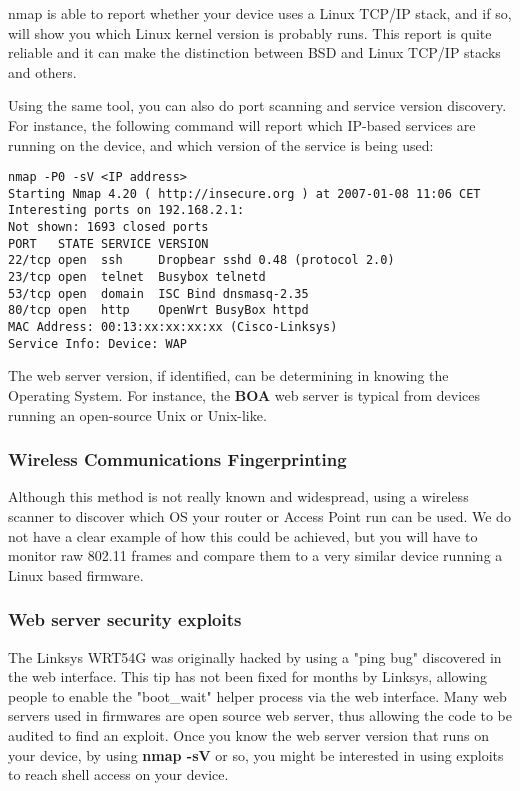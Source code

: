 nmap is able to report whether your device uses a Linux TCP/IP stack, and if so,
will show you which Linux kernel version is probably runs. This report is quite 
reliable and it can make the distinction between BSD and Linux TCP/IP stacks and others.

Using the same tool, you can also do port scanning and service version discovery.
For instance, the following command will report which IP-based services are running
on the device, and which version of the service is being used:

\begin{verbatim}
nmap -P0 -sV <IP address>
Starting Nmap 4.20 ( http://insecure.org ) at 2007-01-08 11:06 CET
Interesting ports on 192.168.2.1:
Not shown: 1693 closed ports
PORT   STATE SERVICE VERSION
22/tcp open  ssh     Dropbear sshd 0.48 (protocol 2.0)
23/tcp open  telnet  Busybox telnetd
53/tcp open  domain  ISC Bind dnsmasq-2.35
80/tcp open  http    OpenWrt BusyBox httpd
MAC Address: 00:13:xx:xx:xx:xx (Cisco-Linksys)
Service Info: Device: WAP
\end{verbatim}

The web server version, if identified, can be determining in knowing the Operating
System. For instance, the \textbf{BOA} web server is typical from devices running 
an open-source Unix or Unix-like.

\subsubsection{Wireless Communications Fingerprinting}

Although this method is not really known and widespread, using a wireless scanner 
to discover which OS your router or Access Point run can be used. We do not have
a clear example of how this could be achieved, but you will have to monitor raw 
802.11 frames and compare them to a very similar device running a Linux based firmware.

\subsubsection{Web server security exploits}

The Linksys WRT54G was originally hacked by using a "ping bug" discovered in the 
web interface. This tip has not been fixed for months by Linksys, allowing people
to enable the "boot\_wait" helper process via the web interface. Many web servers
used in firmwares are open source web server, thus allowing the code to be audited
to find an exploit. Once you know the web server version that runs on your device,
by using \textbf{nmap -sV} or so, you might be interested in using exploits to reach 
shell access on your device.

